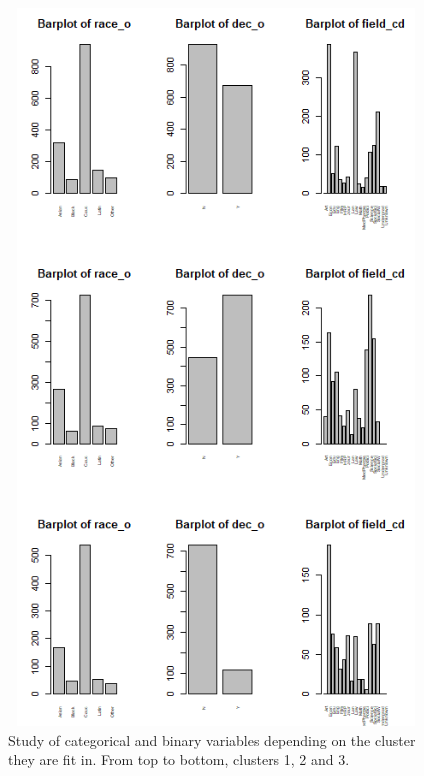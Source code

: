 \begin{figure}
  \centering
  \includegraphics[width= 11cm, height=19cm]{images/profiling/CPG_cluster_raceo_fieldc.png}
  \caption{Study of categorical and binary variables depending on the cluster they are fit in. From top to bottom, clusters 1, 2 and 3.}
  \label{fig:indiv}
\end{figure}


